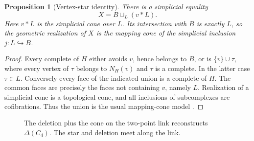 \documentclass[11pt,letterpaper]{article}
\newtheorem{proposition}[theorem]{Proposition}
\theoremstyle{definition}
\theoremstyle{remark}
\newcommand{\Del}{\Delta}
\newcommand{\N}{N}
\begin{document}
\begin{proposition}[Vertex-star identity]\label{prop:star}
There is a simplicial equality
\[
 \boxed{X=B\cup_L(v*L)}.
\]
Here \(v*L\) is the simplicial cone over \(L\). Its intersection with \(B\) is exactly \(L\), so the geometric realization of \(X\) is the mapping cone of the simplicial inclusion \(j:L\hookrightarrow B\).
\end{proposition}
\begin{proof}
Every complete of \(H\) either avoids \(v\), hence belongs to \(B\), or is \(\{v\}\cup\tau\), where every vertex of \(\tau\) belongs to \(\N_H(v)\) and \(\tau\) is a complete. In the latter case \(\tau\in L\). Conversely every face of the indicated union is a complete of \(H\). The common faces are precisely the faces not containing \(v\), namely \(L\). Realization of a simplicial cone is a topological cone, and all inclusions of subcomplexes are cofibrations. Thus the union is the usual mapping-cone model \cite[Ch.~0]{Hatcher2002}.
\end{proof}

\begin{figure}[htbp]
\centering
{}
\caption{The deletion plus the cone on the two-point link reconstructs \(\Del(C_4)\). The star and deletion meet along the link.}
\label{fig:pushout}
\end{figure}
\end{document}
